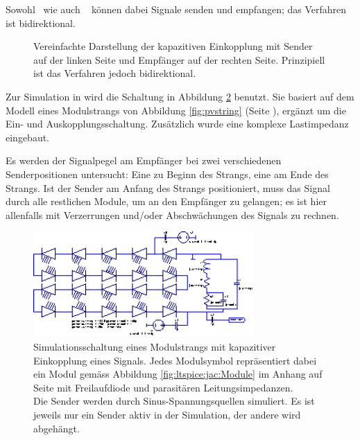 Sowohl \Master ~wie auch \Sensor~ k\"onnen dabei Signale senden und empfangen;
das Verfahren ist bidirektional.

\begin{figure}[h!tb]
    \centering
    
    \caption{%
        Vereinfachte Darstellung  der kapazitiven  Einkopplung mit  Sender auf
        der linken  Seite und  Empf\"anger auf der  rechten Seite. Prinzipiell
        ist das Verfahren jedoch bidirektional.%
    }
    \label{fig:circ:coupling:capacitive}
\end{figure}

Zur   Simulation   in     wird   die   Schaltung  in   Abbildung
\ref{fig:ltspice:capacitive:string} benutzt. Sie basiert  auf dem Modell eines
Modulstrangs von Abbildung  \ref{fig:pvstring} (Seite \pageref{fig:pvstring}),
erg\"anzt  um  die  Ein-  und  Auskopplungsschaltung. Zus\"atzlich  wurde  eine
komplexe Lastimpedanz eingebaut.

Es werden der Signalpegel am Empf\"anger bei zwei verschiedenen Senderpositionen
untersucht: Eine zu Beginn des Strangs, eine am Ende des Strangs. Ist der Sender
am Anfang des Strangs positioniert, muss das Signal durch alle restlichen Module,
um an den Empf\"anger zu gelangen; es ist hier allenfalls mit Verzerrungen und/oder
Abschw\"achungen des Signals zu rechnen.


\begin{figure}[h!tb]
    \centering
    \includegraphics[width=0.75\textwidth]{images/ltspice/jac/capacitive.eps}
    \caption{%
        Simulationsschaltung  eines Modulstrangs  mit kapazitiver  Einkopplung
        eines  Signals. Jedes   Modulsymbol  repr\"asentiert dabei  ein  Modul
        gem\"ass  Abbildung \ref{fig:ltspice:jac:Module}  im Anhang  auf Seite
        \pageref{fig:ltspice:jac:Module}  mit Freilaufdiode  und parasit\"aren
        Leitungsimpedanzen.\protect\\
        Die  Sender  werden  durch  Sinus-Spannungsquellen  simuliert. Es  ist
        jeweils  nur ein  Sender  aktiv  in der  Simulation,  der andere  wird
        abgeh\"angt.%
    }
    \label{fig:ltspice:capacitive:string}
\end{figure}

